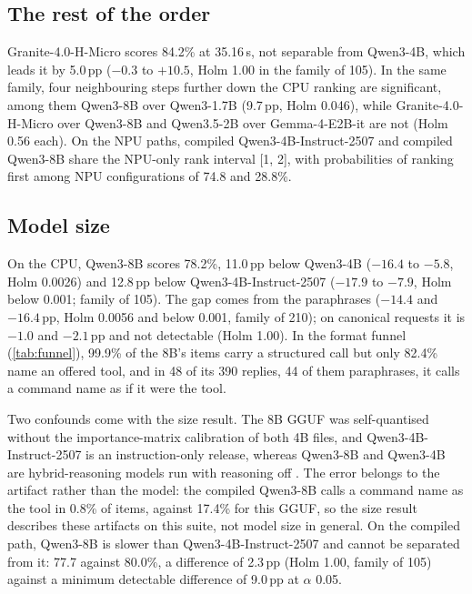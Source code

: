 \documentclass[11pt]{article}
\begin{document}
\subsection{The rest of the order}\label{sec:rest}

Granite-4.0-H-Micro scores 84.2\% at 35.16\,s, not separable from Qwen3-4B, which leads it by 5.0\,pp ($-0.3$ to $+10.5$, Holm 1.00 in the family of 105). In the same family, four neighbouring steps further down the CPU ranking are significant, among them Qwen3-8B over Qwen3-1.7B (9.7\,pp, Holm 0.046), while Granite-4.0-H-Micro over Qwen3-8B and Qwen3.5-2B over Gemma-4-E2B-it are not (Holm 0.56 each). On the NPU paths, compiled Qwen3-4B-Instruct-2507 and compiled Qwen3-8B share the NPU-only rank interval [1, 2], with probabilities of ranking first among NPU configurations of 74.8 and 28.8\%.

\subsection{Model size}\label{sec:size}

On the CPU, Qwen3-8B scores 78.2\%, 11.0\,pp below Qwen3-4B ($-16.4$ to $-5.8$, Holm 0.0026) and 12.8\,pp below Qwen3-4B-Instruct-2507 ($-17.9$ to $-7.9$, Holm below 0.001; family of 105). The gap comes from the paraphrases ($-14.4$ and $-16.4$\,pp, Holm 0.0056 and below 0.001, family of 210); on canonical requests it is $-1.0$ and $-2.1$\,pp and not detectable (Holm 1.00). In the format funnel (\cref{tab:funnel}), 99.9\% of the 8B's items carry a structured call but only 82.4\% name an offered tool, and in 48 of its 390 replies, 44 of them paraphrases, it calls a command name as if it were the tool.

Two confounds come with the size result. The 8B GGUF was self-quantised without the importance-matrix calibration of both 4B files, and Qwen3-4B-Instruct-2507 is an instruction-only release, whereas Qwen3-8B and Qwen3-4B are hybrid-reasoning models run with reasoning off \citep{qwen3cards}. The error belongs to the artifact rather than the model: the compiled Qwen3-8B calls a command name as the tool in 0.8\% of items, against 17.4\% for this GGUF, so the size result describes these artifacts on this suite, not model size in general. On the compiled path, Qwen3-8B is slower than Qwen3-4B-Instruct-2507 and cannot be separated from it: 77.7 against 80.0\%, a difference of 2.3\,pp (Holm 1.00, family of 105) against a minimum detectable difference of 9.0\,pp at $\alpha$ 0.05.
\end{document}
